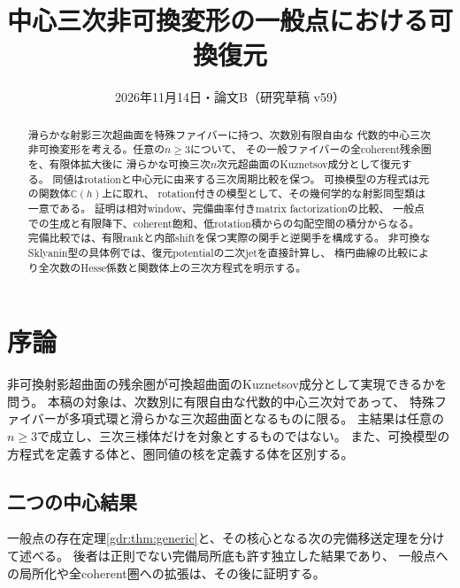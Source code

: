 \makeatletter
{}
\makeatother

\setlength{\emergencystretch}{2em}
\title{中心三次非可換変形の一般点における可換復元}
\author{}
\date{2026年11月14日・論文B（研究草稿 v59）}

\maketitle
\begin{abstract}
滑らかな射影三次超曲面を特殊ファイバーに持つ、次数別有限自由な
代数的中心三次非可換変形を考える。任意の$n\ge3$について、
その一般ファイバーの全coherent残余圏を、有限体拡大後に
滑らかな可換三次$n$次元超曲面のKuznetsov成分として復元する。
同値はrotationと中心元に由来する三次周期比較を保つ。
可換模型の方程式は元の関数体$\mathbb C(h)$上に取れ、
rotation付きの模型として、その幾何学的な射影同型類は一意である。
証明は相対window、完備曲率付きmatrix factorizationの比較、
一般点での生成と有限降下、coherent飽和、低rotation積からの勾配空間の積分からなる。
完備比較では、有限rankと内部shiftを保つ実際の関手と逆関手を構成する。
非可換なSklyanin型の具体例では、復元potentialの二次jetを直接計算し、
楕円曲線の比較により全次数のHesse係数と関数体上の三次方程式を明示する。
\end{abstract}
\tableofcontents

\section{序論}
非可換射影超曲面の残余圏が可換超曲面のKuznetsov成分として実現できるかを問う。
本稿の対象は、次数別に有限自由な代数的中心三次対であって、
特殊ファイバーが多項式環と滑らかな三次超曲面となるものに限る。
主結果は任意の$n\ge3$で成立し、三次三様体だけを対象とするものではない。
また、可換模型の方程式を定義する体と、圏同値の核を定義する体を区別する。

\subsection{二つの中心結果}
一般点の存在定理\ref{gdr:thm:generic}と、その核心となる次の完備移送定理を分けて述べる。
後者は正則でない完備局所底も許す独立した結果であり、
一般点への局所化や全coherent圏への拡張は、その後に証明する。


